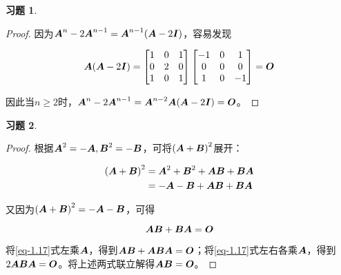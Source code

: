 \documentclass{ctexart}
\newtheorem{problem}{习题}[section]
\begin{document}
\begin{problem}
\end{problem}
\begin{proof}
    因为\(\boldsymbol{A}^n-2\boldsymbol{A}^{n-1}=\boldsymbol{A}^{n-1}(\boldsymbol{A}-2\boldsymbol{I})\)，容易发现

    \begin{equation*}
        \boldsymbol{A}(\boldsymbol{A}-2\boldsymbol{I})=
        \begin{bmatrix}
            1 & 0 & 1 \\0&2&0\\1&0&1
        \end{bmatrix}
        \begin{bmatrix}
            -1 & 0 & 1 \\0&0&0\\1&0&-1
        \end{bmatrix}=\boldsymbol{O}
    \end{equation*}

    因此当\(n\ge2\)时，\(\boldsymbol{A}^n-2\boldsymbol{A}^{n-1}=\boldsymbol{A}^{n-2}\boldsymbol{A}(\boldsymbol{A}-2\boldsymbol{I})=\boldsymbol{O}\)。
\end{proof}

\begin{problem}
\end{problem}
\begin{proof}
    根据\(\boldsymbol{A}^2=-\boldsymbol{A},\boldsymbol{B}^2=-\boldsymbol{B}\)，可将\(\left( \boldsymbol{A}+\boldsymbol{B} \right)^2\)展开：

    \begin{align*}
        \left( \boldsymbol{A}+\boldsymbol{B} \right)^2 & =\boldsymbol{A}^2+\boldsymbol{B}^2+\boldsymbol{A}\boldsymbol{B}+\boldsymbol{B}\boldsymbol{A} \\
                              & =-\boldsymbol{A}-\boldsymbol{B}+\boldsymbol{A}\boldsymbol{B}+\boldsymbol{B}\boldsymbol{A}
    \end{align*}

    又因为\(\left( \boldsymbol{A}+\boldsymbol{B} \right)^2=-\boldsymbol{A}-\boldsymbol{B}\)，可得

    \begin{equation}\label{eq-1.17}
        \boldsymbol{A}\boldsymbol{B}+\boldsymbol{B}\boldsymbol{A}=\boldsymbol{O}
    \end{equation}

    将\eqref{eq-1.17}式左乘\(\boldsymbol{A}\)，得到\(\boldsymbol{A}\boldsymbol{B}+\boldsymbol{A}\boldsymbol{B}\boldsymbol{A}=\boldsymbol{O}\)；将\eqref{eq-1.17}式左右各乘\(\boldsymbol{A}\)，得到\(2\boldsymbol{A}\boldsymbol{B}\boldsymbol{A}=\boldsymbol{O}\)。将上述两式联立解得\(\boldsymbol{A}\boldsymbol{B}=\boldsymbol{O}\)。
\end{proof}
\end{document}
